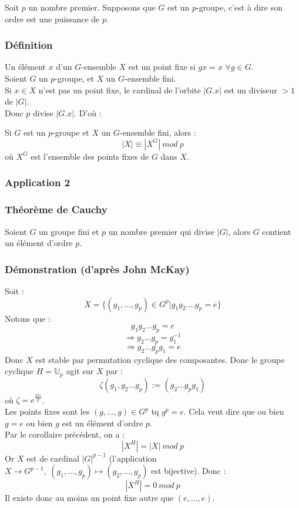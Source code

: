 \documentclass[a4paper, oneside]{report}
\theoremstyle{break}
\newcommand{\U}{\mathbb{U}}
\begin{document}
Soit $p$ un nombre premier. Supposons que $G$ est un $p$-groupe, c'est à dire son ordre est une puissance de $p$.\\
\subsubsection{Définition}
Un élément $x$ d'un $G$-ensemble $X$ est un point fixe si $gx=x$ $\forall g\in G$.\\

Soient $G$ un $p$-groupe, et $X$ un $G$-ensemble fini.\\
Si $x\in X$ n'est pas un point fixe, le cardinal de l'orbite $|G.x|$ est un diviseur $>1$ de $|G|$.\\
Donc $p$ divise $|G.x|$. D'où :

\cor
Si $G$ est un $p$-groupe et $X$ un $G$-ensemble fini, alors :
$$|X| \equiv |X^G|~mod~p$$
où $X^G$ est l'ensemble des points fixes de $G$ dans $X$.

\subsubsection{Application 2}

\subsubsection{Théorème de Cauchy}
Soient $G$ un groupe fini et $p$ un nombre premier qui divise $|G|$, alors $G$ contient un élément d'ordre $p$.

\subsubsection{Démonstration (d'après John McKay)}
Soit :
$$X=\{(g_1,...,g_p)\in G^p | g_1g_2....g_p =e \}$$
Notons que :
$$g_1g_2...g_p = e$$
$$\Rightarrow g_2...g_p=g_1^{-1}$$
$$\Rightarrow g_2...g_pg_1=e$$
Donc $X$ est stable par permutation cyclique des composantes. Donc le groupe cyclique $H=\U_p$ agit sur $X$ par :
$$\zeta(g_1,g_2...g_p) := (g_2...g_pg_1)$$
où $\zeta = e^{\frac{2\pi i}{p}}$.\\
Les points fixes sont les $(g,...,g)\in G^p$ tq $g^p=e$. Cela veut dire que ou bien $g=e$ ou bien $g$ est un élément d'ordre $p$.\\
Par le corollaire précédent, on a :
$$|X^H|=|X|~mod~p$$
Or $X$ est de cardinal $|G|^{p-1}$ (l'application $X \rightarrow G^{p-1},~(g_1,...,g_p)\mapsto (g_2,...,g_p)$ est bijective). Donc :
$$|X^H|=0~mod~p$$
Il existe donc au moins un point fixe autre que $(e,...,e)$.
\end{document}

